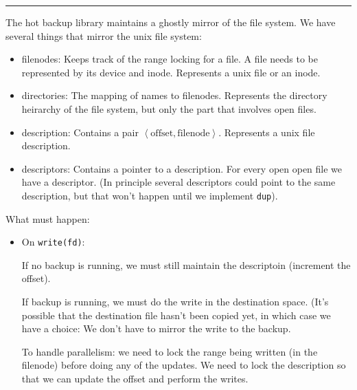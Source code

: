 \documentclass[10pt]{article}
\begin{document}
 \hrule

The hot backup library maintains a ghostly mirror of the file system.  We have several things that mirror the unix file system:
\begin{itemize}
\item filenodes: Keeps track of the range locking for a file.  A file needs to be represented by its device and inode.  Represents a unix file or an inode.
\item directories: The mapping of names to filenodes. Represents the directory heirarchy of the file system, but only the part that involves open files.
\item description: Contains a pair $\left<\mbox{offset},\mbox{filenode}\right>$.  Represents a unix file description.
\item descriptors: Contains a pointer to a description.  For every open open file we have a descriptor.  (In principle several descriptors could point to the same description, but that won't happen until we implement \texttt{dup}).
\end{itemize}

What must happen:
\begin{itemize}
\item On \texttt{write(fd)}: 

 If no backup is running, we must still maintain the descriptoin (increment the offset).

 If backup is running, we must do the write in the destination space.
 (It's possible that the destination file hasn't been copied yet, in
 which case we have a choice: We don't have to mirror the write to the
 backup.

 To handle parallelism: we need to lock the range being written (in the filenode) before doing any of the updates.
  We need to lock the description so that we can update the offset and perform the writes.

\end{itemize}
\end{document}
